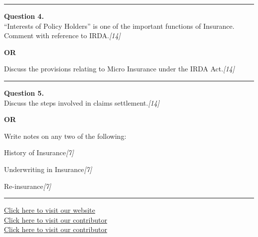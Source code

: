 \documentclass[11pt,a4paper]{article}
\newcommand{\pts}[1]{\hfill   \textit{[#1]}}
\begin{document}
\medskip\rule{\linewidth}{0.2pt}




\noindent   \textbf{Question 4.} \\
``Interests of Policy Holders'' is one of the important functions of Insurance. Comment with reference to IRDA.\pts{14}

\centerline{   \textbf{OR}}

Discuss the provisions relating to Micro Insurance under the IRDA Act.\pts{14}

\medskip\rule{\linewidth}{0.2pt}




\noindent   \textbf{Question 5.} \\
Discuss the steps involved in claims settlement.\pts{14}

\centerline{   \textbf{OR}}

Write notes on any two of the following:

\begin{parts}
  \item History of Insurance\pts{7}
  \item Underwriting in Insurance\pts{7}
  \item Re-insurance\pts{7}
\end{parts}

\vfill
\rule{\linewidth}{0.4pt}

\begin{center}\small
\href{https://bhu-exam.vercel.app/}{Click here to visit our website}\\[4pt]
\href{https://me-aryan.vercel.app/}{Click here to visit our contributor}\\[4pt]
\href{https://quashan-me.vercel.app/}{Click here to visit our contributor}
\end{center}
\end{document}
